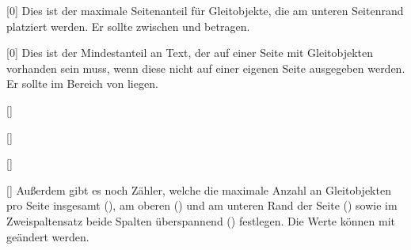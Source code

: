 \begin{Declaration}{}[0\bottomfraction]
\printdeclarationlist*%
%
Dies ist der maximale Seitenanteil für Gleitobjekte, die am unteren Seitenrand 
platziert werden. Er sollte zwischen  und  betragen.
\end{Declaration}

\begin{Declaration}{}[0\textfraction]
\printdeclarationlist*%
%
Dies ist der Mindestanteil an Text, der auf einer Seite mit Gleitobjekten 
vorhanden sein muss, wenn diese nicht auf einer eigenen Seite ausgegeben 
werden. Er sollte im Bereich von  liegen.
\end{Declaration}

\begin{Declaration}{}[]
\begin{Declaration}{}[]
\begin{Declaration}{}[]
\begin{Declaration}{}[]
\printdeclarationlist*%
%
Außerdem gibt es noch Zähler, welche die maximale Anzahl an Gleitobjekten pro 
Seite insgesamt (), am oberen () und 
am unteren Rand der Seite () sowie im Zweispaltensatz 
beide Spalten überspannend () festlegen. Die Werte 
können mit  geändert 
werden.
\end{Declaration}
\end{Declaration}
\end{Declaration}
\end{Declaration}

